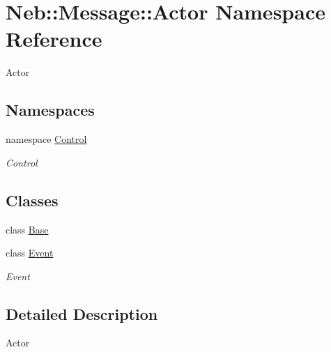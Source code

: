 \hypertarget{namespaceNeb_1_1Message_1_1Actor}{\section{\-Neb\-:\-:\-Message\-:\-:\-Actor \-Namespace \-Reference}
\label{namespaceNeb_1_1Message_1_1Actor}
}


\-Actor  


\subsection*{\-Namespaces}
\begin{DoxyCompactItemize}
\item 
namespace \hyperlink{namespaceNeb_1_1Message_1_1Actor_1_1Control}{\-Control}
\begin{DoxyCompactList}\small\item\em \-Control \end{DoxyCompactList}\end{DoxyCompactItemize}
\subsection*{\-Classes}
\begin{DoxyCompactItemize}
\item 
class \hyperlink{classNeb_1_1Message_1_1Actor_1_1Base}{\-Base}
\item 
class \hyperlink{classNeb_1_1Message_1_1Actor_1_1Event}{\-Event}
\begin{DoxyCompactList}\small\item\em \-Event \end{DoxyCompactList}\end{DoxyCompactItemize}


\subsection{\-Detailed \-Description}
\-Actor 